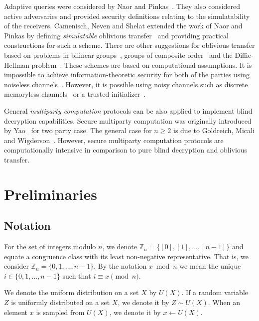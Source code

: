 \documentclass[10pt,journal]{IEEEtran}
\newcommand{\Z}{\mathbb{Z}}
\newcommand{\rv}[1]{{#1}}
\begin{document}
Adaptive queries were considered by Naor and Pinkas~\cite{Naor_1999_2}. They also considered active adversaries
and provided security definitions relating to the simulatability of the receivers.
Camenisch, Neven and Shelat extended the work of Naor and Pinkas by defining \emph{simulatable} oblivious transfer~\cite{Camenisch_2007}
and providing practical constructions for such a scheme.
There are other suggestions for oblivious transfer based on problems in bilinear groups~\cite{Green_2008},
groups of composite order~\cite{Jarecki_2009} and the Diffie-Hellman problem~\cite{Kurosawa_2009,Kurosawa_2010,Green_2011_2,Kurosawa_2011,Zhang_2013,Guleria_2015}.
These schemes
are based on computational assumptions.
It is impossible to achieve information-theoretic
security for both of the parties using noiseless channels~\cite{Damgard_1999}. However, it
is possible using noisy channels such as discrete memoryless channels~\cite{Crepeau_2005}
or a trusted initializer~\cite{Rivest_1999}.

General \emph{multiparty computation} protocols can be also applied to implement blind decryption capabilities.
Secure multiparty computation was originally introduced by Yao~\cite{Yao_1982_2} for two party case.
The general case for $n \geq 2$ is due to Goldreich, Micali and Wigderson~\cite{Goldreich_1987}.
However, secure multiparty computation protocols are computationally intensive in comparison
to pure blind decryption and oblivious transfer.

\section{Preliminaries}
\label{sec:Preliminaries}

\subsection{Notation}

For the set of integers modulo $n$,
we denote $\Z_n = \{[0],[1],\ldots,[n-1]\}$ and equate a congruence class
with its least non-negative representative. That is,
we consider $\Z_n = \{0,1,\ldots,n-1\}$. By the notation $x \bmod{n}$ we mean
the unique $i \in \{0,1,\ldots,n-1\}$ such that $i \equiv x \pmod{n}$.

We denote the uniform distribution on a set $X$ by $U(X)$. If a random variable
$\rv{Z}$ is uniformly distributed on a set $X$, we denote it by $\rv{Z} \sim U(X)$.
When an element $x$ is sampled from $U(X)$, we denote it by $x \leftarrow U(X)$.
\end{document}
